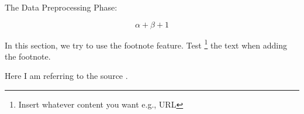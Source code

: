 The Data Preprocessing Phase:

\begin{equation}
\alpha + \beta + 1
\end{equation}

In this section, we try to use the footnote feature. Test \footnote{Insert whatever content you want e.g., URL} the text when adding the footnote.

Here I am referring to the source \cite{DataScience}.